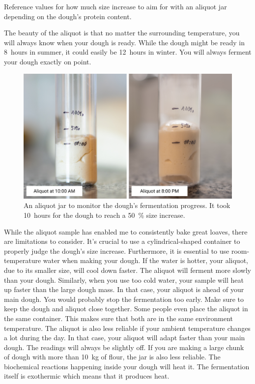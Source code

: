 \begin{table}[!htb]
    \begin{center}
        
        \caption[Increase of size versus protein content]{Reference values for
            how much size increase to aim for with an aliquot jar depending on
            the dough's protein content.}
    \end{center}
\end{table}

The beauty of the aliquot is that no matter the surrounding
temperature, you will always know when your dough is ready.
While the dough might be ready in 8~hours in summer, it could
easily be 12~hours in winter. You will always ferment your
dough exactly on point.


\begin{figure}[!htb]
  \includegraphics[width=\textwidth]{aliquot-before-after}
  \caption[Aliquot Jar]{An aliquot jar to monitor the dough's fermentation
      progress.  It took 10~hours for the dough to reach a \qty{50}{\percent}
      size increase.}
\end{figure}

While the aliquot sample has enabled me to consistently bake
great loaves, there are limitations to consider. It's crucial
to use a cylindrical-shaped container to properly judge
the dough's size increase. Furthermore, it is essential
to use room-temperature water when making your dough. If the
water is hotter, your aliquot, due to its smaller size,
will cool down faster. The aliquot will ferment more slowly
than your dough. Similarly, when you use too cold water,
your sample will heat up faster than the large dough mass.
In that case, your aliquot is ahead of your main dough. You
would probably stop the fermentation too early. Make sure
to keep the dough and aliquot close together. Some people even
place the aliquot in the same container. This makes sure that
both are in the same environment temperature. The aliquot
is also less reliable if your ambient temperature changes
a lot during the day. In that case, your aliquot will adapt
faster than your main dough. The readings will always be slightly
off. If you are making a large chunk of dough with more
than \qty{10}{\kg} of flour, the jar is also less reliable. The biochemical
reactions happening inside your dough will heat it.
The fermentation itself is exothermic which means
that it produces heat.

